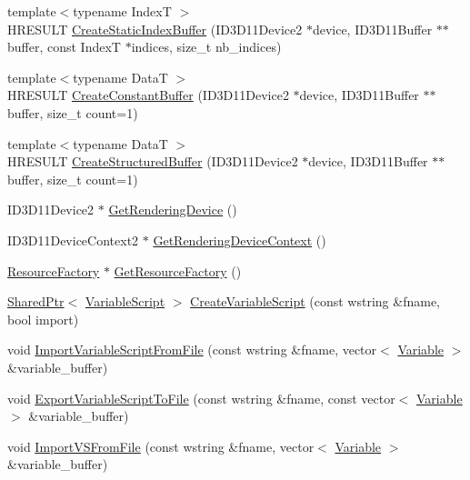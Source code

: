 \begin{DoxyCompactItemize}
\item 
{\footnotesize template$<$typename IndexT $>$ }\\H\+R\+E\+S\+U\+LT \hyperlink{namespacemage_a6d7b762686800ea46b6f56dbfa0727a2}{Create\+Static\+Index\+Buffer} (I\+D3\+D11\+Device2 $\ast$device, I\+D3\+D11\+Buffer $\ast$$\ast$buffer, const IndexT $\ast$indices, size\+\_\+t nb\+\_\+indices)
\item 
{\footnotesize template$<$typename DataT $>$ }\\H\+R\+E\+S\+U\+LT \hyperlink{namespacemage_a5eed34f604a40811bb0282dff7e6e712}{Create\+Constant\+Buffer} (I\+D3\+D11\+Device2 $\ast$device, I\+D3\+D11\+Buffer $\ast$$\ast$buffer, size\+\_\+t count=1)
\item 
{\footnotesize template$<$typename DataT $>$ }\\H\+R\+E\+S\+U\+LT \hyperlink{namespacemage_a9090692dded3dfa6abbcb2023b1e6327}{Create\+Structured\+Buffer} (I\+D3\+D11\+Device2 $\ast$device, I\+D3\+D11\+Buffer $\ast$$\ast$buffer, size\+\_\+t count=1)
\item 
I\+D3\+D11\+Device2 $\ast$ \hyperlink{namespacemage_a30c7feb10b2be75bbce6d9c3739899c6}{Get\+Rendering\+Device} ()
\item 
I\+D3\+D11\+Device\+Context2 $\ast$ \hyperlink{namespacemage_a55d3eaa7476e19ec8969e27d69249d95}{Get\+Rendering\+Device\+Context} ()
\item 
\hyperlink{classmage_1_1_resource_factory}{Resource\+Factory} $\ast$ \hyperlink{namespacemage_a36a7338e52586e714ef646dea200a115}{Get\+Resource\+Factory} ()
\item 
\hyperlink{namespacemage_a1e01ae66713838a7a67d30e44c67703e}{Shared\+Ptr}$<$ \hyperlink{classmage_1_1_variable_script}{Variable\+Script} $>$ \hyperlink{namespacemage_a4ee2d46e5220246892bb34b7d1e97fbe}{Create\+Variable\+Script} (const wstring \&fname, bool import)
\item 
void \hyperlink{namespacemage_a6ab176518e4d778ef8e28f2cfd63672a}{Import\+Variable\+Script\+From\+File} (const wstring \&fname, vector$<$ \hyperlink{structmage_1_1_variable}{Variable} $>$ \&variable\+\_\+buffer)
\item 
void \hyperlink{namespacemage_aa879d3bf0554136881745e716b84e3af}{Export\+Variable\+Script\+To\+File} (const wstring \&fname, const vector$<$ \hyperlink{structmage_1_1_variable}{Variable} $>$ \&variable\+\_\+buffer)
\item 
void \hyperlink{namespacemage_aa9fc2d2f7e0a2b6bebc707d3eaf126ff}{Import\+V\+S\+From\+File} (const wstring \&fname, vector$<$ \hyperlink{structmage_1_1_variable}{Variable} $>$ \&variable\+\_\+buffer)
$$
\end{DoxyCompactItemize}
